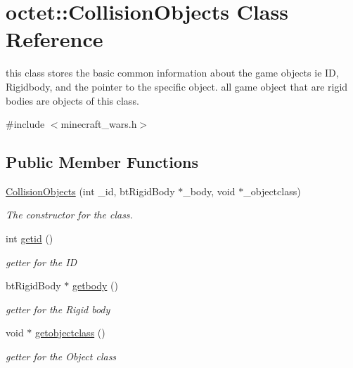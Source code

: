 \hypertarget{classoctet_1_1_collision_objects}{\section{octet\+:\+:Collision\+Objects Class Reference}
\label{classoctet_1_1_collision_objects}
}


this class stores the basic common information about the game objects ie I\+D, Rigidbody, and the pointer to the specific object. all game object that are rigid bodies are objects of this class.  




{\ttfamily \#include $<$minecraft\+\_\+wars.\+h$>$}

\subsection*{Public Member Functions}
\begin{DoxyCompactItemize}
\item 
\hyperlink{classoctet_1_1_collision_objects_a2d8ca87d8b6efea2bde6c1a83882c9f9}{Collision\+Objects} (int \+\_\+id, bt\+Rigid\+Body $\ast$\+\_\+body, void $\ast$\+\_\+objectclass)
\begin{DoxyCompactList}\small\item\em The constructor for the class. \end{DoxyCompactList}\item 
int \hyperlink{classoctet_1_1_collision_objects_a0ed6b430acb9293c5891dd8cdd692cf7}{getid} ()
\begin{DoxyCompactList}\small\item\em getter for the I\+D \end{DoxyCompactList}\item 
bt\+Rigid\+Body $\ast$ \hyperlink{classoctet_1_1_collision_objects_a6307bb12ac79846cc6e082631b16fde1}{getbody} ()
\begin{DoxyCompactList}\small\item\em getter for the Rigid body \end{DoxyCompactList}\item 
void $\ast$ \hyperlink{classoctet_1_1_collision_objects_a25a95174b8567e118d5542df78a23acb}{getobjectclass} ()
\begin{DoxyCompactList}\small\item\em getter for the Object class \end{DoxyCompactList}\end{DoxyCompactItemize}
